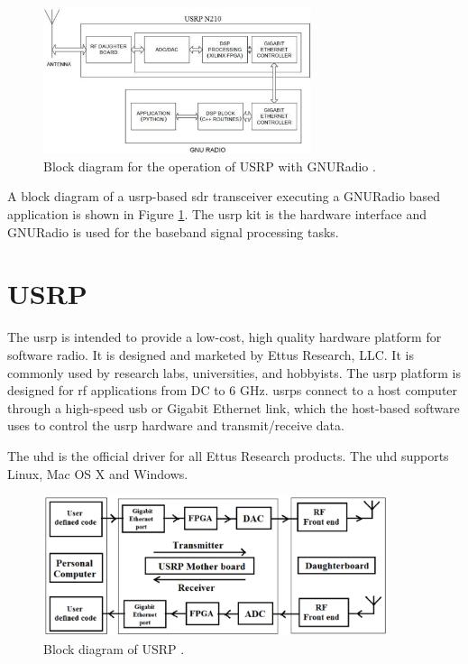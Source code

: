 \begin{figure}
  \centering
  \includegraphics[width=0.7\textwidth]{../images/usrpGNURadioBlock}
  \caption[USRP operation with GNURadio]{Block diagram for the operation of USRP
  with GNURadio {\cite{kranthi13}}.}
  \label{usrpGNURadioBlock}
\end{figure}

A block diagram of a \gls{usrp}-based \gls{sdr} transceiver executing a GNURadio based 
application is shown in Figure \ref{usrpGNURadioBlock}. The \gls{usrp} kit is the 
hardware interface and GNURadio is used for the baseband signal processing
tasks.


\section{USRP}

The \gls{usrp} is intended to provide a 
low-cost, high quality hardware platform for software radio. It is designed
and marketed by Ettus Research, LLC. It is commonly used by research labs,
universities, and hobbyists. The \gls{usrp} platform is designed for \gls{rf} applications
from DC to 6 GHz. \gls{usrp}s connect to a host computer through a high-speed \gls{usb} or
Gigabit Ethernet link, which the host-based software uses to control the \gls{usrp}
hardware and transmit/receive data.

The \gls{uhd} is the official driver for all Ettus Research
products. The \gls{uhd} supports Linux, Mac OS X and Windows.

\begin{figure}
\centering
\includegraphics[width=0.9\textwidth]{../images/usrpBlock}
\caption[Block diagram of USRP]{Block diagram of USRP
\protect\cite{kranthi13}.}
\label{usrpBlock}
\end{figure}

